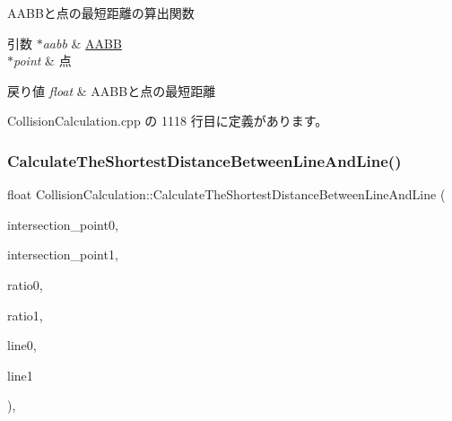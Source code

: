 A\+A\+B\+Bと点の最短距離の算出関数 


\begin{DoxyParams}{引数}
{\em $\ast$aabb} & \mbox{\hyperlink{class_a_a_b_b}{A\+A\+BB}} \\
\hline
{\em $\ast$point} & 点 \\
\hline
\end{DoxyParams}

\begin{DoxyRetVals}{戻り値}
{\em float} & A\+A\+B\+Bと点の最短距離 \\
\hline
\end{DoxyRetVals}


 Collision\+Calculation.\+cpp の 1118 行目に定義があります。

\mbox{\label{class_collision_calculation_ae9adc067d647f1ea540ed3f2915d46e4}} 
\subsubsection{\texorpdfstring{Calculate\+The\+Shortest\+Distance\+Between\+Line\+And\+Line()}{CalculateTheShortestDistanceBetweenLineAndLine()}}
{\footnotesize\ttfamily float Collision\+Calculation\+::\+Calculate\+The\+Shortest\+Distance\+Between\+Line\+And\+Line (\begin{DoxyParamCaption}\item[{\mbox{\hyperlink{class_vector3_d}{Vector3D}} $\ast$}]{intersection\+\_\+point0,  }\item[{\mbox{\hyperlink{class_vector3_d}{Vector3D}} $\ast$}]{intersection\+\_\+point1,  }\item[{float $\ast$}]{ratio0,  }\item[{float $\ast$}]{ratio1,  }\item[{\mbox{\hyperlink{class_line_segment}{Line\+Segment}} $\ast$}]{line0,  }\item[{\mbox{\hyperlink{class_line_segment}{Line\+Segment}} $\ast$}]{line1 }\end{DoxyParamCaption})\hspace{0.3cm}{\ttfamily [static]}, {\ttfamily [private]}}



